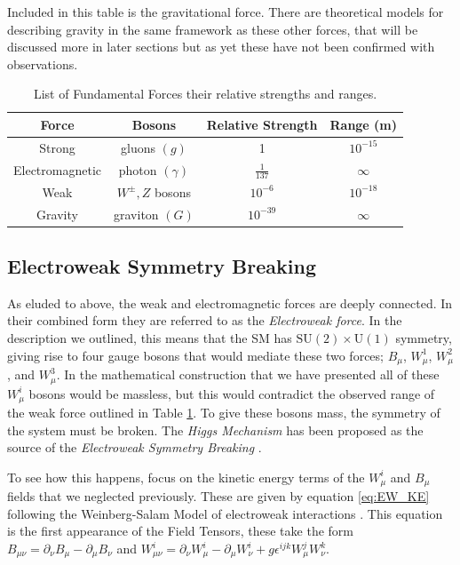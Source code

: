 Included in this table is the gravitational force. There are theoretical models for describing gravity in the same framework as these other forces, that will be discussed more in later sections but as yet these have not been confirmed with observations.

\begin{table}
\begin{center}
\begin{tabular}{c|c|c|c}
\hline 
\hline
Force & Bosons & Relative Strength & Range (m) \\ \hline \hline
Strong & gluons $\left(g\right)$ & 1 & $10^{-15}$ \\
Electromagnetic & photon $\left(\gamma\right)$ & $\frac{1}{137}$ & $\infty$ \\
Weak & $W^{\pm}, Z$ bosons & $10^{-6}$ & $10^{-18}$ \\
Gravity & graviton $\left(G\right)$ & $10^{-39}$ & $\infty$ \\
\hline
\end{tabular}
\end{center}
\caption[List of Fundamental Forces their relative strengths and ranges.]{List of Fundamental Forces their relative strengths and ranges.}
\label{tab:Forces}
\end{table}

\subsection{Electroweak Symmetry Breaking}
\label{sec:EWsymmetry}
As eluded to above, the weak and electromagnetic forces are deeply connected. In their combined form they are referred to as the \textit{Electroweak force}. In the description we outlined, this means that the SM has $\mathrm{SU}(2) \times \mathrm{U}(1)$ symmetry, giving rise to four gauge bosons that would mediate these two forces; $B_{\mu}$, $W_{\mu}^{1}$, $W_{\mu}^{2}$, and $W_{\mu}^{3}$. In the mathematical construction that we have presented all of these $W_{\mu}^{i}$ bosons would be massless, but this would contradict the observed range of the weak force outlined in Table \ref{tab:Forces}. To give these bosons mass, the symmetry of the system must be broken. The \textit{Higgs Mechanism} \cite{Higgs:1964ia,Higgs:1964pj,Higgs:1966ev,Englert:1964et,Guralnik:1964eu,Kibble:1967sv} has been proposed as the source of the \textit{Electroweak Symmetry Breaking} \cite{Dawson:2008jk}. 

To see how this happens, focus on the kinetic energy terms of the $W_{\mu}^{i}$ and $B_{\mu}$ fields that we neglected previously. These are given by equation \eqref{eq:EW_KE} following the Weinberg-Salam Model of electroweak interactions \cite{StandardModel67_1,StandardModel67_2,StandardModel67_3,StandardModel67_4}. This equation is the first appearance of the Field Tensors, these take the form $B_{\mu \nu} = \partial_{\nu}B_{\mu} - \partial_{\mu}B_{\nu}$ and $W_{\mu \nu}^{i} = \partial_{\nu}W_{\mu}^{i} - \partial_{\mu}W_{\nu}^{i} + g\epsilon^{ijk}W_{\mu}^{j}W_{\nu}^{k}$.

